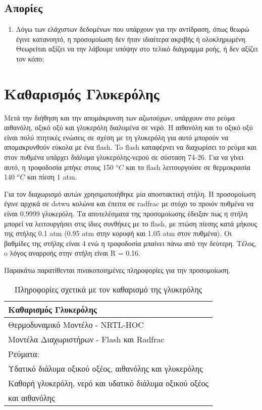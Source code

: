 \documentclass[11pt]{article}
\begin{document}
\subsection{Απορίες}
\label{sec:orge6ca80a}
\begin{enumerate}
\item Λόγω των ελάχιστων δεδομένων που υπάρχουν για την αντίδραση, όπως θεωρώ έγινε κατανοητό, η προσομοίωση δεν ήταν ιδιαίτερα ακριβής ή ολοκληρωμένη. Θεωρείται αξίζει να την λάβουμε υπόψην στο τελικό διάγραμμα ροής, ή δεν αξίζει τον κόπο;
\end{enumerate}

\section{Καθαρισμός Γλυκερόλης}
\label{sec:org053deb0}
Μετά την διήθηση και την απομάκρυνση των αζωτούχων, υπάρχουν στο ρεύμα αιθανόλη, οξικό οξύ και γλυκερόλη διαλυμένα σε νερό. Η αιθανόλη και το οξικό οξύ είναι πολύ πτητικές ενώσεις σε σχέση με τη γλυκερόλη για αυτό μπορούν να απομακρυνθούν εύκολα με ένα flash. To flash καταφέρνει να διαχωρίσει το ρεύμα και στον πυθμένα υπάρχει διάλυμα γλυκερόλης-νερού σε σύσταση 74-26. Για να γίνει αυτό, η τροφοδοσία μπήκε στους 150 \(^oC\) και το flash λειτουργούσε σε θερμοκρασία 140 \(^oC\) και πίεση 1 atm.

Για τον διαχωρισμό αυτών χρησιμοποιήθηκε μία αποστακτική στήλη. Η προσομοίωση έγινε αρχικά σε dstwu κολώνα και έπειτα σε radfrac με στόχο το προιόν πυθμένα να είναι 0.9999 γλυκερόλη. Τα αποτελέσματα της προσομοίωσης έδειξαν πως η στήλη μπορεί να λειτουργήσει στις ίδιες συνθήκες με το flash, με πτώση πίεσης κατά μήκους της στήλης 0.1 atm (0.95 atm στην κορυφή και 1.05 atm στον πυθμένα). Οι βαθμίδες της στήλης είναι 4 ενώ η τροφοδοσία μπαίνει πάνω από την δεύτερη. Τέλος, o λόγος αναρροής στην στήλη είναι R = 0.16.

Παρακάτω παρατίθενται πινακοποιημένες πληροφορίες για την προσομοίωση.

\begin{table}[htbp]
\caption{Πληροφορίες σχετικά με τον καθαρισμό της γλυκερόλης}
\centering
\begin{tabular}{l}
\hline
Καθαρισμός Γλυκερόλης\\
\hline
Θερμοδυναμικό Μοντέλο - NRTL-HOC\\
Μοντέλα Διαχωριστήρων - Flash και Radfrac\\
Ρεύματα:\\
\hline
Υδατικό διάλυμα οξικού οξέος, αιθανόλης και γλυκερόλης\\
\hline
Καθαρή γλυκερόλη, νερό και υδατικό διάλυμα οξικού οξέος\\
και αιθανόλης\\
\hline
\end{tabular}
\end{table}
\end{document}
